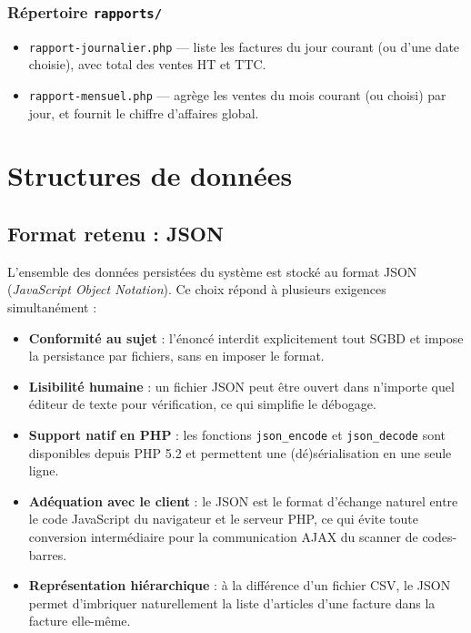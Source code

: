 \documentclass[12pt,a4paper]{article}
\begin{document}
\subsubsection{Répertoire \texttt{rapports/}}

\begin{itemize}[leftmargin=1.5em]
    \item \texttt{rapport-journalier.php} --- liste les factures du jour courant (ou d'une date choisie), avec total des ventes HT et TTC.
    \item \texttt{rapport-mensuel.php} --- agrège les ventes du mois courant (ou choisi) par jour, et fournit le chiffre d'affaires global.
\end{itemize}

\section{Structures de données}
\label{sec:donnees}

\subsection{Format retenu : JSON}

L'ensemble des données persistées du système est stocké au format JSON (\textit{JavaScript Object Notation}). Ce choix répond à plusieurs exigences simultanément :

\begin{itemize}[leftmargin=1.5em]
    \item \textbf{Conformité au sujet} : l'énoncé interdit explicitement tout SGBD et impose la persistance par fichiers, sans en imposer le format.
    \item \textbf{Lisibilité humaine} : un fichier JSON peut être ouvert dans n'importe quel éditeur de texte pour vérification, ce qui simplifie le débogage.
    \item \textbf{Support natif en PHP} : les fonctions \texttt{json\_encode} et \texttt{json\_decode} sont disponibles depuis PHP 5.2 et permettent une (dé)sérialisation en une seule ligne.
    \item \textbf{Adéquation avec le client} : le JSON est le format d'échange naturel entre le code JavaScript du navigateur et le serveur PHP, ce qui évite toute conversion intermédiaire pour la communication AJAX du scanner de codes-barres.
    \item \textbf{Représentation hiérarchique} : à la différence d'un fichier CSV, le JSON permet d'imbriquer naturellement la liste d'articles d'une facture dans la facture elle-même.
\end{itemize}
\end{document}
